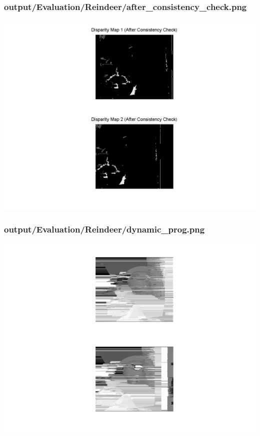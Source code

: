 \subsubsection{output/Evaluation/Reindeer/after\_consistency\_check.png}
    \includegraphics[scale=0.5]{output/Evaluation/Reindeer/after_consistency_check.png}

\subsubsection{output/Evaluation/Reindeer/dynamic\_prog.png}
    \includegraphics[scale=0.5]{output/Evaluation/Reindeer/dynamic_prog.png}

